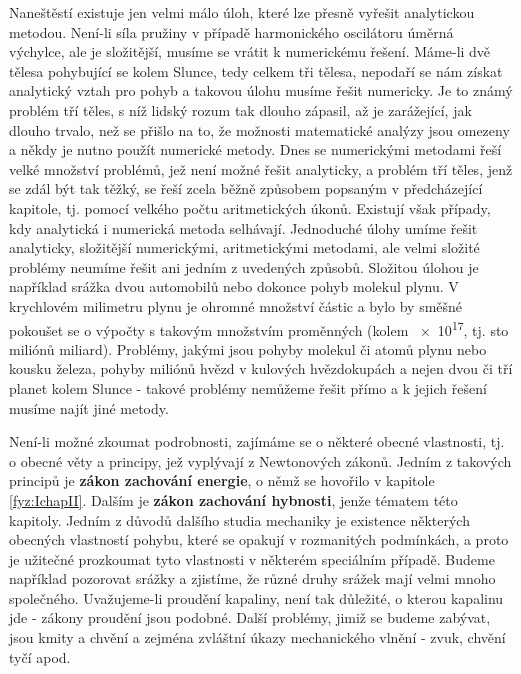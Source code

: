     Naneštěstí existuje jen velmi málo úloh, které lze přesně vyřešit analytickou metodou. Není-li 
    síla pružiny v případě harmonického oscilátoru úměrná výchylce, ale je složitější, musíme se 
    vrátit k numerickému řešení. Máme-li dvě tělesa pohybující se kolem Slunce, tedy celkem tři 
    tělesa, nepodaří se nám získat analytický vztah pro pohyb a takovou úlohu musíme řešit 
    numericky. Je to známý problém tří těles, s níž lidský rozum tak dlouho zápasil, až je 
    zarážející, jak dlouho trvalo, než se přišlo na to, že možnosti matematické analýzy jsou 
    omezeny a někdy je nutno použít numerické metody. Dnes se numerickými metodami řeší velké 
    množství problémů, jež není možné řešit analyticky, a problém tří těles, jenž se zdál být tak 
    těžký, se řeší zcela běžně způsobem popsaným v předcházející kapitole, tj. pomocí velkého počtu 
    aritmetických úkonů. Existují však případy, kdy analytická i numerická metoda selhávají. 
    Jednoduché úlohy umíme řešit analyticky, složitější numerickými, aritmetickými metodami, ale 
    velmi složité problémy neumíme řešit ani jedním z uvedených způsobů. Složitou úlohou je 
    například srážka dvou automobilů nebo dokonce pohyb molekul plynu. V krychlovém milimetru 
    plynu je ohromné množství částic a bylo by směšné pokoušet se o výpočty s takovým množstvím 
    proměnných (kolem \num{e17}, tj. sto miliónů miliard). Problémy, jakými jsou pohyby molekul či 
    atomů plynu nebo kousku železa, pohyby miliónů hvězd v kulových hvězdokupách a nejen dvou či 
    tří planet kolem Slunce - takové problémy nemůžeme řešit přímo a k jejich řešení musíme najít 
    jiné metody.
    
    Není-li možné zkoumat podrobnosti, zajímáme se o některé obecné vlastnosti, tj. o obecné věty 
    a principy, jež vyplývají z Newtonových zákonů. Jedním z takových principů je \textbf{zákon 
    zachování energie}, o němž se hovořilo v kapitole \ref{fyz:IchapII}. Dalším je \textbf{zákon 
    zachování hybnosti}, jenže tématem této kapitoly. Jedním z důvodů dalšího studia mechaniky je 
    existence některých obecných vlastností pohybu, které se opakují v rozmanitých podmínkách, a 
    proto je užitečné prozkoumat tyto vlastnosti v některém speciálním případě. Budeme například 
    pozorovat srážky a zjistíme, že různé druhy srážek mají velmi mnoho společného. Uvažujeme-li 
    proudění kapaliny, není tak důležité, o kterou kapalinu jde - zákony proudění jsou podobné. 
    Další problémy, jimiž se budeme zabývat, jsou kmity a chvění a zejména zvláštní úkazy 
    mechanického vlnění - zvuk, chvění tyčí apod.
    
